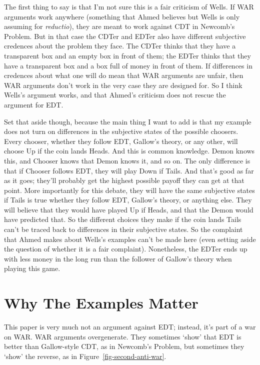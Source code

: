 \documentclass[
  10pt,
  letterpaper,
  DIV=11,
  numbers=noendperiod,
  twoside]{scrartcl}
\begin{document}
The first thing to say is that I'm not sure this is a fair criticism of
Wells. If WAR arguments work anywhere (something that Ahmed believes but
Wells is only assuming for \emph{reductio}), they are meant to work
against CDT in Newcomb's Problem. But in that case the CDTer and EDTer
also have different subjective credences about the problem they face.
The CDTer thinks that they have a transparent box and an empty box in
front of them; the EDTer thinks that they have a transparent box and a
box full of money in front of them. If differences in credences about
what one will do mean that WAR arguments are unfair, then WAR arguments
don't work in the very case they are designed for. So I think Wells's
argument works, and that Ahmed's criticism does not rescue the argument
for EDT.

Set that aside though, because the main thing I want to add is that my
example does not turn on differences in the subjective states of the
possible choosers. Every chooser, whether they follow EDT, Gallow's
theory, or any other, will choose Up if the coin lands Heads. And this
is common knowledge. Demon knows this, and Chooser knows that Demon
knows it, and so on. The only difference is that if Chooser follows EDT,
they will play Down if Tails. And that's good as far as it goes; they'll
probably get the highest possible payoff they can get at that point.
More importantly for this debate, they will have the same subjective
states if Tails is true whether they follow EDT, Gallow's theory, or
anything else. They will believe that they would have played Up if
Heads, and that the Demon would have predicted that. So the different
choices they make if the coin lands Tails can't be traced back to
differences in their subjective states. So the complaint that Ahmed
makes about Wells's examples can't be made here (even setting aside the
question of whether it is a fair complaint). Nonetheless, the EDTer ends
up with less money in the long run than the follower of Gallow's theory
when playing this game.

\section{Why The Examples Matter}\label{why-the-examples-matter}

This paper is very much not an argument against EDT; instead, it's part
of a war on WAR. WAR arguments overgenerate. They sometimes `show' that
EDT is better than Gallow-style CDT, as in Newcomb's Problem, but
sometimes they `show' the reverse, as in
Figure~\ref{fig-second-anti-war}.
\end{document}
